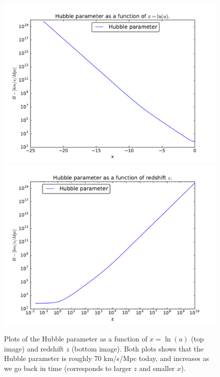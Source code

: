 \documentclass[12pt]{article}
\begin{document}
\begin{figure}[h]
\centering
\includegraphics[width=0.8\linewidth]{Plots/Hubble_parameter.pdf}
\includegraphics[width=0.8\linewidth]{Plots/Hubble_parameter_redshift.pdf}
\caption{Plots of the Hubble parameter as a function of $x=\ln(a)$ (top image) and redshift $z$ (bottom image). Both plots shows that the Hubble parameter is roughly 70 km/s/Mpc today, and increases as we go back in time (corresponds to larger $z$ and smaller $x$).}
\label{fig:Hubble_parameter_plot}
\end{figure}


\end{document}
